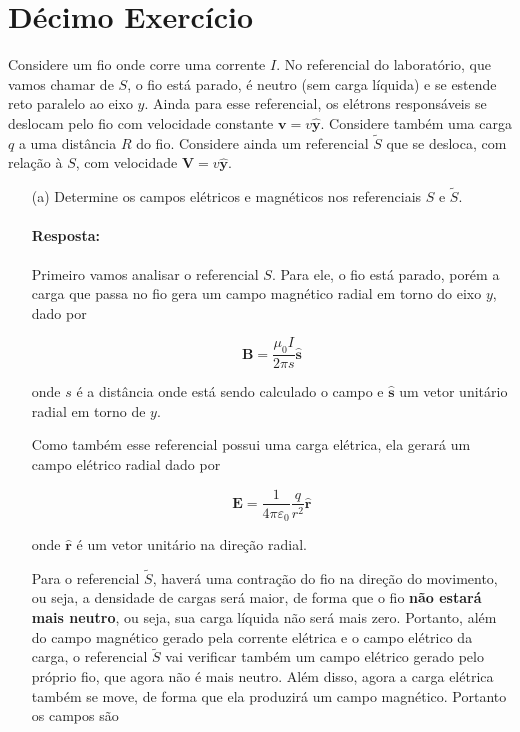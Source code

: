 \documentclass[10pt,a4paper]{article}
\begin{document}
 \section{Décimo Exercício}
Considere um fio onde corre uma corrente $I$. No referencial do laboratório, que vamos chamar de $S$, o fio está parado, é neutro (sem carga líquida) e se estende reto paralelo ao eixo $y$. Ainda para esse referencial, os elétrons responsáveis se deslocam pelo fio com velocidade constante $\mathbf{v}=v\mathbf{\hat{y}}$. Considere também uma carga $q$ a uma distância $R$ do fio. Considere ainda um referencial $\tilde{S}$ que se desloca, com relação à $S$, com velocidade $\mathbf{V}=v\mathbf{\hat{y}}$.

\begin{itemize}
\item[(a)] Determine os campos elétricos e magnéticos nos referenciais $S$ e $\tilde{S}$.

\paragraph{Resposta:} Primeiro vamos analisar o referencial $S$. Para ele, o fio está parado, porém a carga que passa no fio gera um campo magnético radial em torno do eixo $y$, dado por 

\begin{equation*}
		\mathbf{B} = \frac{\mu_0I}{2\pi s}\mathbf{\hat{s}} 
\end{equation*}

onde $s$ é a distância onde está sendo calculado o campo e $\mathbf{\hat{s}}$ um vetor unitário radial em torno de $y$. 

Como também esse referencial possui uma carga elétrica, ela gerará um campo elétrico radial dado por 

\begin{equation*}
\mathbf{E} = \frac{1}{4\pi \varepsilon_0}\frac{q}{r^2}\mathbf{\hat{r}}
\end{equation*}

onde $\mathbf{\hat{r}}$ é um vetor unitário na direção radial. 

Para o referencial $\tilde{S}$, haverá uma contração do fio na direção do movimento, ou seja, a densidade de cargas será maior, de forma que o fio \textbf{não estará mais neutro}, ou seja, sua carga líquida não será mais zero. Portanto, além do campo magnético gerado pela corrente elétrica e o campo elétrico da carga, o referencial $\tilde{S}$ vai verificar também um campo elétrico gerado pelo próprio fio, que agora não é mais neutro. Além disso, agora a carga elétrica também se move, de forma que ela produzirá um campo magnético. Portanto os campos são 


\end{itemize}
\end{document}
